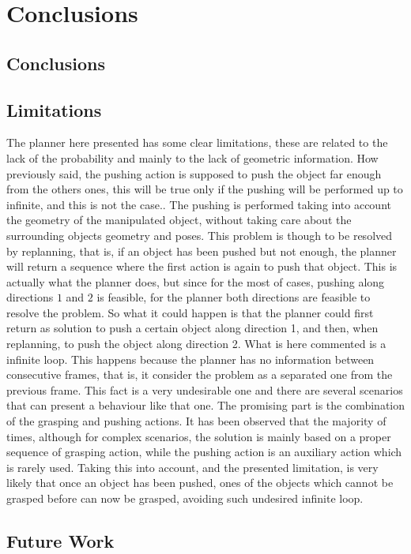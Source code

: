 \chapter{Conclusions}
\label{ch:conclusions}

\section{Conclusions}

\section{Limitations}
The planner here presented has some clear limitations, these are related to the lack of the probability and mainly to the lack of geometric information. 
How previously said, the pushing action is supposed to push the object far enough from the others ones, this will be true only if the pushing will be performed up to infinite, and this is not the case.. The pushing is performed taking into account the geometry of the manipulated object, without taking care about the surrounding objects geometry and poses. This problem is though to be resolved by replanning, that is, if an object has been pushed but not enough, the planner will return a sequence where the first action is again to push that object. This is actually what the planner does, but since for the most of cases, pushing along directions $1$ and $2$ is feasible, for the planner both directions are feasible to resolve the problem. So what it could happen is that the planner could first return as solution to push a certain object along direction 1, and then, when replanning, to push the object along direction 2. What is here commented is a infinite loop. This happens because the planner has no information between consecutive frames, that is, it consider the problem as a separated one from the previous frame. 
This fact is a very undesirable one and there are several scenarios that can present a behaviour like that one. The promising part is the combination of the grasping and pushing actions. It has been observed that the majority of times, although for complex scenarios, the solution is mainly based on a proper sequence of grasping action, while the pushing action is an auxiliary action which is rarely used. Taking this into account, and the presented limitation, is very likely that once an object has been pushed, ones of the objects which cannot be grasped before can now be grasped, avoiding such undesired infinite loop.  

\section{Future Work}
